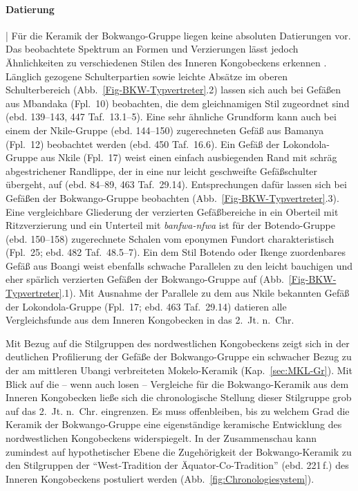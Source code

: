 \paragraph{Datierung}\hspace{-.5em}|\hspace{.5em}%
Für die Keramik der Bokwango-Gruppe liegen keine absoluten Datierungen vor. Das beobachtete Spektrum an Formen und Verzierungen lässt jedoch Ähnlichkeiten zu verschiedenen Stilen des Inneren Kongobeckens erkennen \parencite{Wotzka.1995}. Länglich gezogene Schulterpartien sowie leichte Absätze im oberen Schulterbereich (Abb.~\ref{Fig-BKW-Typvertreter}.2) lassen sich auch bei Gefäßen aus Mbandaka (Fpl.~10) beobachten, die dem gleichnamigen Stil zugeordnet sind (ebd. 139--143, 447 Taf.~13.1--5). Eine sehr ähnliche Grundform kann auch bei einem der Nkile-Gruppe (ebd. 144--150) zugerechneten Gefäß aus Bamanya (Fpl.~12) beobachtet werden (ebd. 450 Taf.~16.6). Ein Gefäß der Lokondola-Gruppe aus Nkile (Fpl.~17) weist einen einfach ausbiegenden Rand mit schräg abgestrichener Randlippe, der in eine nur leicht geschweifte Gefäßschulter übergeht, auf (ebd. 84--89, 463 Taf.~29.14). Entsprechungen dafür lassen sich bei Gefäßen der Bokwango-Gruppe beobachten (Abb.~\ref{Fig-BKW-Typvertreter}.3). Eine vergleichbare Gliederung der verzierten Gefäßbereiche in ein Oberteil mit Ritzverzierung und ein Unterteil mit \textit{banfwa-nfwa} ist für der Botendo-Gruppe (ebd. 150--158) zugerechnete Schalen vom eponymen Fundort charakteristisch (Fpl.~25; ebd. 482 Taf.~48.5--7). Ein dem Stil Botendo oder Ikenge \parencite[siehe][]{Eggert.1980c} zuordenbares Gefäß aus Boangi \parencite[Fpl.~61;][508 Taf.~74.11]{Wotzka.1995} weist ebenfalls schwache Parallelen zu den leicht bauchigen und eher spärlich verzierten Gefäßen der Bokwango-Gruppe auf (Abb.~\ref{Fig-BKW-Typvertreter}.1). Mit Ausnahme der Parallele zu dem aus Nkile bekannten Gefäß der Lokondola-Gruppe (Fpl.~17; ebd. 463 Taf.~29.14) datieren alle Vergleichsfunde aus dem Inneren Kongobecken in das 2.~Jt. n.~Chr.

Mit Bezug auf die Stilgruppen des nordwestlichen Kongobeckens zeigt sich in der deutlichen Profilierung der Gefäße der Bokwango-Gruppe ein schwacher Bezug zu der am mittleren \mbox{Ubangi} verbreiteten Mokelo-Keramik (Kap.~\ref{sec:MKL-Gr}). Mit Blick auf die -- wenn auch losen -- Vergleiche für die Bokwango-Keramik aus dem Inneren Kongobecken ließe sich die chronologische Stellung dieser Stilgruppe grob auf das 2.~Jt. n.~Chr. eingrenzen. Es muss offenbleiben, bis zu welchem Grad die Keramik der Bokwango-Gruppe eine eigenständige keramische Entwicklung des nordwestlichen Kongobeckens widerspiegelt. In der Zusammenschau kann zumindest auf hypothetischer Ebene die Zugehörigkeit der Bokwango-Keramik zu den Stilgruppen der \enquote{West-Tradition der Äquator-Co-Tradition} (ebd. 221\,f.) des Inneren Kongobeckens postuliert werden (Abb.~\ref{fig:Chronologiesystem}).

